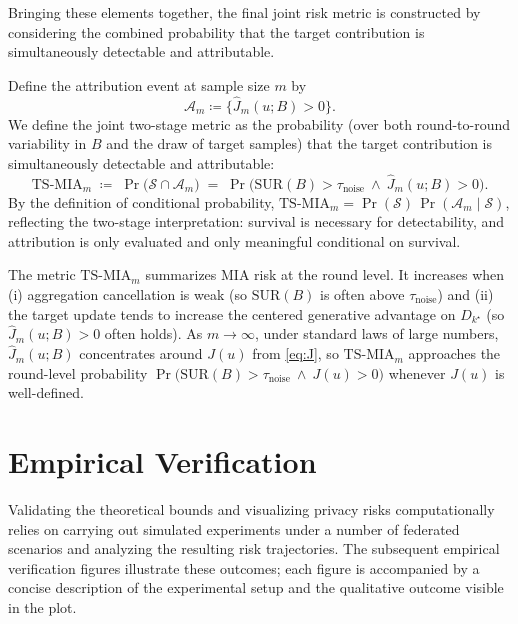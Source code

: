 \documentclass[bdcc,article,submit,pdftex]{Definitions/mdpi}
\newcommand{\tindex}{k^\star}
\newcommand{\utarget}{u}
\begin{document}
Bringing these elements together, the final joint risk metric is constructed by considering the combined probability that the target contribution is simultaneously detectable and attributable.

Define the attribution event at sample size $m$ by
\begin{equation}
\label{eq:event_attr}
\mathcal{A}_m\coloneqq \{\widehat{J}_m(\utarget;B)>0\}.
\end{equation}
We define the joint two-stage metric as the probability (over both round-to-round variability in $B$ and the draw of target samples)
that the target contribution is simultaneously detectable and attributable:
\begin{equation}
\label{eq:two_stage_metric}
\mathrm{TS\text{-}MIA}_m
\;\coloneqq\;
\Pr\big(\mathcal{S}\cap \mathcal{A}_m\big)
\;=\;
\Pr\!\big(\mathrm{SUR}(B)>\tau_{\mathrm{noise}} \ \wedge\  \widehat{J}_m(\utarget;B)>0\big).
\end{equation}
By the definition of conditional probability, $\mathrm{TS\text{-}MIA}_m=\Pr(\mathcal{S})\,\Pr(\mathcal{A}_m\mid \mathcal{S})$, reflecting the two-stage interpretation:
survival is necessary for detectability, and attribution is only evaluated and only meaningful conditional on survival.

\begin{Remark}
\label{rem:two_stage_metric_interp}
The metric $\mathrm{TS\text{-}MIA}_m$ summarizes MIA risk at the round level.
It increases when (i) aggregation cancellation is weak (so $\mathrm{SUR}(B)$ is often above $\tau_{\mathrm{noise}}$) and
(ii) the target update tends to increase the centered generative advantage on $D_{\tindex}$ (so $\widehat{J}_m(\utarget;B)>0$ often holds).
As $m\to\infty$, under standard laws of large numbers, $\widehat{J}_m(\utarget;B)$ concentrates around
$J(\utarget)$ from \eqref{eq:J}, so $\mathrm{TS\text{-}MIA}_m$ approaches the round-level probability
$\Pr\big(\mathrm{SUR}(B)>\tau_{\mathrm{noise}} \ \wedge\  J(\utarget)>0\big)$ whenever $J(\utarget)$ is well-defined.
\end{Remark}

\section{Empirical Verification}
\label{sec:sim_results}

Validating the theoretical bounds and visualizing privacy risks computationally relies on carrying out simulated experiments under a number of federated scenarios and analyzing the resulting risk trajectories. The subsequent empirical verification figures illustrate these outcomes; each figure is accompanied by a concise description
of the experimental setup and the qualitative outcome visible in the plot.
\end{document}
